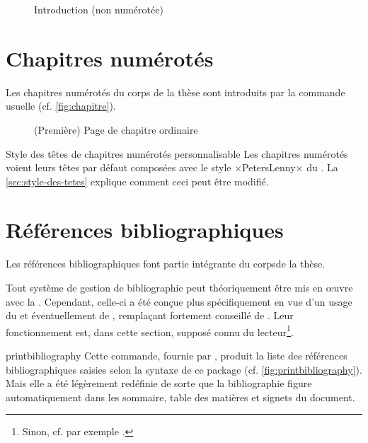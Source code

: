 \begin{figure}[p]
  \centering
  \caption{Introduction (non numérotée)}
  \label{fig:introduction}
\end{figure}

\section{Chapitres numérotés}
\label{sec:chapitres-numerotes}

Les chapitres numérotés du corps de la thèse sont introduits par la commande
usuelle  (cf. \vref{fig:chapitre}).

\begin{figure}[ht]
  \centering
  \caption[Chapitre ordinaire]{(Première) Page de chapitre
    ordinaire}
  \label{fig:chapitre}
\end{figure}

\begin{dbremark}{Style des têtes de chapitres numérotés personnalisable}{}
  Les chapitres numérotés voient leurs têtes par défaut composées avec le style
  ×PetersLenny× du . La \vref{sec:style-des-tetes} explique
  comment ceci peut être modifié.
\end{dbremark}

\section{Références bibliographiques}

Les références bibliographiques font partie intégrante du corpsde la thèse.

Tout système de gestion de bibliographie peut théoriquement être mis en œuvre
avec la \yatcl. Cependant, celle-ci a été conçue plus spécifiquement en vue
d'un usage du  et éventuellement de ,
remplaçant fortement conseillé de . Leur fonctionnement est,
dans cette section, supposé connu du lecteur\footnote{Sinon, cf. par exemple
  \cite{en-ligne6}.}.

\begin{docCommand}[doc description=\mandatory]{printbibliography}{}
  Cette commande, fournie par , produit la liste des
  références bibliographiques saisies selon la syntaxe de ce package (cf.
  \vref{fig:printbibliography}). Mais elle a été légèrement redéfinie de sorte
  que la bibliographie figure automatiquement dans les sommaire, table des
  matières et signets du document.
\end{docCommand}

